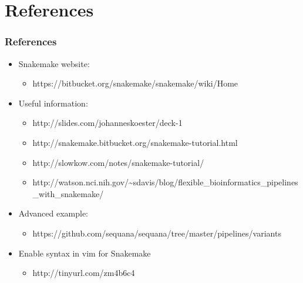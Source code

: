 \documentclass{beamer}
\begin{document}
\section{References}

\begin{frame}
    \frametitle{References}
    \begin{itemize}
        \item Snakemake website:
        \begin{itemize}
            \item {\tiny https://bitbucket.org/snakemake/snakemake/wiki/Home}
        \end{itemize}
        \item Useful information:
        \begin{itemize}
            \item {\tiny http://slides.com/johanneskoester/deck-1}
            \item {\tiny http://snakemake.bitbucket.org/snakemake-tutorial.html}
            \item {\tiny http://slowkow.com/notes/snakemake-tutorial/}
            \item {\tiny http://watson.nci.nih.gov/{\textasciitilde{}}sdavis/blog/flexible\_bioinformatics\_pipelines\_with\_snakemake/}
        \end{itemize}
        \item Advanced example:
        \begin{itemize}
            \item {\tiny https://github.com/sequana/sequana/tree/master/pipelines/variants}
        \end{itemize}
        \item Enable syntax in vim for Snakemake
        \begin{itemize}
            \item {\tiny http://tinyurl.com/zm4b6c4}
        \end{itemize}
    \end{itemize}
\end{frame}
\end{document}
